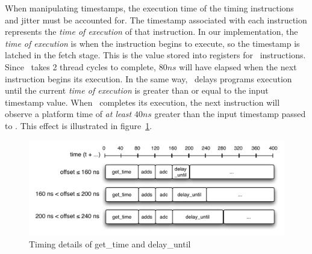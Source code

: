 When manipulating timestamps, the execution time of the timing instructions and jitter must be accounted for.
The timestamp associated with each instruction represents the \emph{time of execution} of that instruction.
In our implementation, the \emph{time of execution} is when the instruction begins to execute, so the timestamp is latched in the fetch stage.
This is the value stored into registers for \gettime\ instructions.  
Since \gettime\ takes 2 thread cycles to complete, $80ns$  will have elapsed when the next instruction begins its execution.
In the same way, \delayuntil\ delays programs execution until the current \emph{time of execution} is greater than or equal to the input timestamp value.
When \delayuntil\ completes its execution, the next instruction will observe a platform time of \emph{at least} $40ns$ greater than the input timestamp passed to \delayuntil.
This effect is illustrated in figure~\ref{fig:delay_until_details}.
\begin{figure}[h]
  \begin{center}
    \includegraphics[scale=.7]{figs/delay_until_details}
  \end{center}
  \vspace{-3mm}
  \caption{Timing details of get\_time and delay\_until}
  \label{fig:delay_until_details}
\end{figure}

